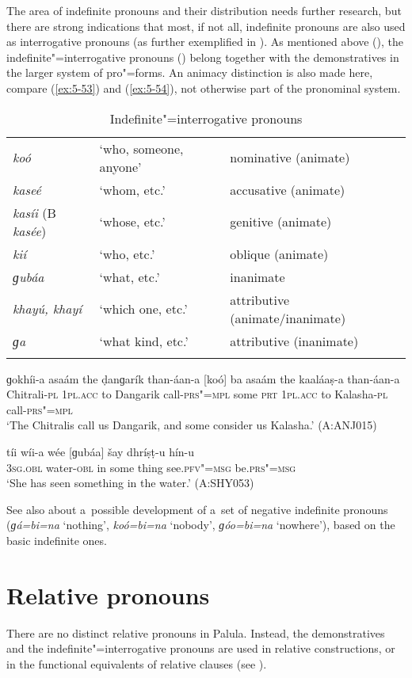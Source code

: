 The area of indefinite pronouns and their distribution needs further research, but there are strong indications that most, if not all, indefinite pronouns are also used as interrogative pronouns (as further exemplified in ). As mentioned above (), the indefinite"=interrogative pronouns () belong together with the demonstratives in the larger system of pro"=forms. An animacy distinction is also made here, compare (\ref{ex:5-53}) and (\ref{ex:5-54}), not otherwise part of the pronominal system.

\begin{table}[H]
\caption{Indefinite"=interrogative pronouns}
\begin{tabularx}{\textwidth}{ l l l }
\lsptoprule
\textit{koó} &
`who, someone, anyone' &
nominative (animate)\\
\textit{kaseé} &
`whom, etc.' &
accusative (animate)\\
\textit{kasíi} (B \textit{kasée}) &
`whose, etc.' &
genitive (animate)\\
\textit{kií} &
`who, etc.' &
oblique (animate)\\
\textit{ɡubáa} &
`what, etc.' &
inanimate \\
\textit{khayú, khayí} &
`which one, etc.' &
attributive (animate/inanimate)\\
\textit{ɡa} &
`what kind, etc.' &
attributive (inanimate)\\\lspbottomrule
\end{tabularx}
\label{tab:5-iipro}
\end{table}


\begin{exe}
\ex
\label{ex:5-53}
\gll ɡokhíi-a asaám the ḍanɡarík than-áan-a [koó] ba asaám the kaaláaṣ-a than-áan-a\\
Chitrali-\textsc{pl} \textsc{1pl.acc} to Dangarik call-\textsc{prs"=mpl} some \textsc{prt} \textsc{1pl.acc} to Kalasha-\textsc{pl} call-\textsc{prs"=mpl}\\
\glt `The Chitralis call us Dangarik, and some consider us Kalasha.' (A:ANJ015)

\ex
\label{ex:5-54}
\gll tíi wíi-a wée [ɡubáa] šay dhríṣṭ-u hín-u\\
\textsc{3sg.obl} water-\textsc{obl} in some thing see.\textsc{pfv"=msg} be.\textsc{prs"=msg}\\
\glt `She has seen something in the water.' (A:SHY053)
\end{exe}


See also  about a~possible development of a~set of negative indefinite pronouns (\textit{ɡá=bi=na} `nothing', \textit{koó=bi=na} `nobody', \textit{ɡóo=bi=na} `nowhere'), based on the basic indefinite ones.

\section{Relative pronouns}
\label{sec:5-8}


There are no distinct relative pronouns in Palula. Instead, the demonstratives and the indefinite"=interrogative pronouns are used in relative constructions, or in the functional equivalents of relative clauses (see ).